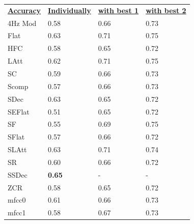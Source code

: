 \begin{table}[H]
\begin{tabular}{llll}
{\ul \textbf{Accuracy}} & {\ul \textbf{Individually}} & {\ul \textbf{with best 1}} & {\ul \textbf{with best 2}} \\
4Hz Mod                 & 0.58                        & 0.66                       & 0.73                       \\
Flat                    & 0.63                        & 0.71                       & 0.75                       \\
HFC                     & 0.58                        & 0.65                       & 0.72                       \\
LAtt                    & 0.62                        & 0.71                       & 0.75                       \\
SC                      & 0.59                        & 0.66                       & 0.73                       \\
Scomp                   & 0.57                        & 0.66                       & 0.73                       \\
SDec                    & 0.63                        & 0.65                       & 0.72                       \\
SEFlat                  & 0.51                        & 0.65                       & 0.72                       \\
SF                      & 0.55                        & 0.69                       & 0.75                       \\
SFlat                   & 0.57                        & 0.66                       & 0.72                       \\
SLAtt                   & 0.63                        & 0.71                       & 0.74                       \\
SR                      & 0.60                        & 0.66                       & 0.72                       \\
SSDec                   & \textbf{0.65}               & -                          & -                          \\
ZCR                     & 0.58                        & 0.65                       & 0.72                       \\
mfcc0                   & 0.61                        & 0.66                       & 0.73                       \\
mfcc1                   & 0.58                        & 0.67                       & 0.73                       \\

\end{tabular}
\end{table}
